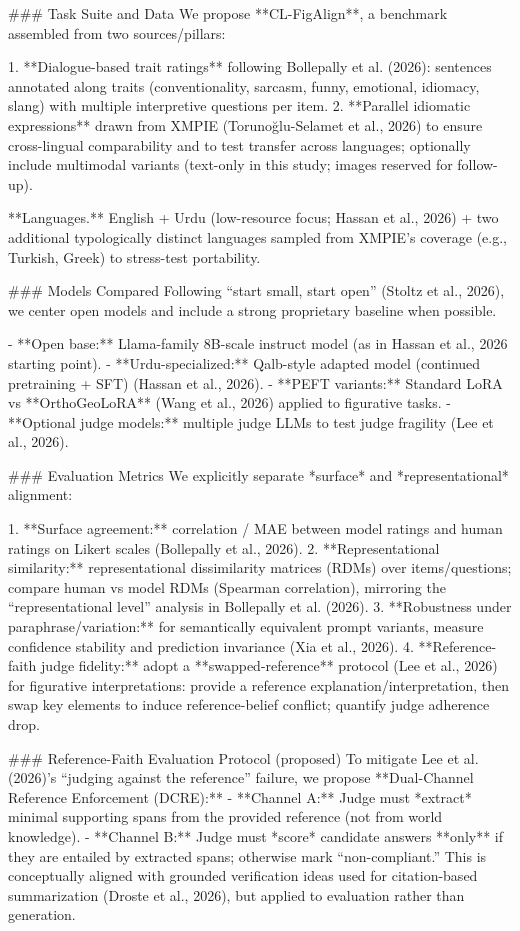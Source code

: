 ### Task Suite and Data  
We propose **CL-FigAlign**, a benchmark assembled from two sources/pillars:

1. **Dialogue-based trait ratings** following Bollepally et al. (2026): sentences annotated along traits (conventionality, sarcasm, funny, emotional, idiomacy, slang) with multiple interpretive questions per item.  
2. **Parallel idiomatic expressions** drawn from XMPIE (Torunoğlu-Selamet et al., 2026) to ensure cross-lingual comparability and to test transfer across languages; optionally include multimodal variants (text-only in this study; images reserved for follow-up).

**Languages.** English + Urdu (low-resource focus; Hassan et al., 2026) + two additional typologically distinct languages sampled from XMPIE’s coverage (e.g., Turkish, Greek) to stress-test portability.

### Models Compared  
Following “start small, start open” (Stoltz et al., 2026), we center open models and include a strong proprietary baseline when possible.

- **Open base:** Llama-family 8B-scale instruct model (as in Hassan et al., 2026 starting point).  
- **Urdu-specialized:** Qalb-style adapted model (continued pretraining + SFT) (Hassan et al., 2026).  
- **PEFT variants:** Standard LoRA vs **OrthoGeoLoRA** (Wang et al., 2026) applied to figurative tasks.  
- **Optional judge models:** multiple judge LLMs to test judge fragility (Lee et al., 2026).

### Evaluation Metrics  
We explicitly separate *surface* and *representational* alignment:

1. **Surface agreement:** correlation / MAE between model ratings and human ratings on Likert scales (Bollepally et al., 2026).  
2. **Representational similarity:** representational dissimilarity matrices (RDMs) over items/questions; compare human vs model RDMs (Spearman correlation), mirroring the “representational level” analysis in Bollepally et al. (2026).  
3. **Robustness under paraphrase/variation:** for semantically equivalent prompt variants, measure confidence stability and prediction invariance (Xia et al., 2026).  
4. **Reference-faith judge fidelity:** adopt a **swapped-reference** protocol (Lee et al., 2026) for figurative interpretations: provide a reference explanation/interpretation, then swap key elements to induce reference-belief conflict; quantify judge adherence drop.

### Reference-Faith Evaluation Protocol (proposed)  
To mitigate Lee et al. (2026)’s “judging against the reference” failure, we propose **Dual-Channel Reference Enforcement (DCRE):**
- **Channel A:** Judge must *extract* minimal supporting spans from the provided reference (not from world knowledge).  
- **Channel B:** Judge must *score* candidate answers **only** if they are entailed by extracted spans; otherwise mark “non-compliant.”  
This is conceptually aligned with grounded verification ideas used for citation-based summarization (Droste et al., 2026), but applied to evaluation rather than generation.

